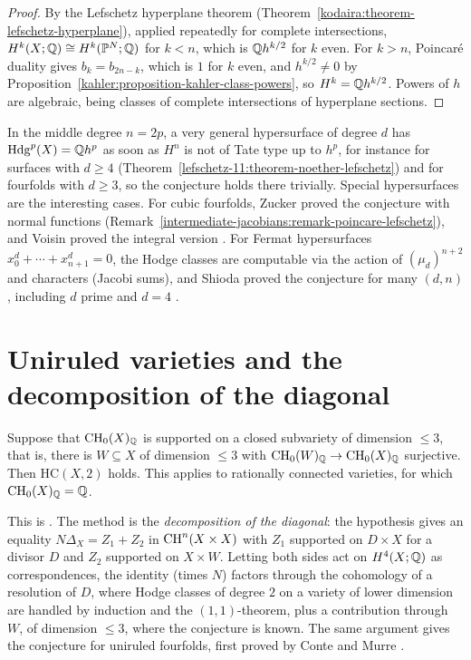 \begin{proof}
By the Lefschetz hyperplane theorem (Theorem~\ref{kodaira:theorem-lefschetz-hyperplane}), applied repeatedly for complete intersections, $H^k(X; \mathbb{Q}) \cong H^k(\mathbb{P}^N; \mathbb{Q})$ for $k < n$, which is
$\mathbb{Q} h^{k/2}$ for $k$ even. For $k > n$, Poincar\'e duality gives $b_k = b_{2n-k}$, which is $1$ for $k$ even, and $h^{k/2} \neq 0$ by Proposition~\ref{kahler:proposition-kahler-class-powers}, so
$H^k = \mathbb{Q} h^{k/2}$. Powers of $h$ are algebraic, being classes of complete intersections of hyperplane sections.
\end{proof}

\begin{remark}\label{known-cases:remark-middle-degree}
In the middle degree $n = 2p$, a very general hypersurface of degree $d$ has $\mathrm{Hdg}^p(X) = \mathbb{Q} h^p$ as soon as $H^{n}$ is not of Tate type up to $h^p$, for instance for surfaces with $d \geq 4$
(Theorem~\ref{lefschetz-11:theorem-noether-lefschetz}) and for fourfolds with $d \geq 3$, so the conjecture holds there trivially. Special hypersurfaces are the interesting cases. For cubic
fourfolds, Zucker proved the conjecture with normal functions (Remark~\ref{intermediate-jacobians:remark-poincare-lefschetz}), and Voisin proved the integral version \cite{voisin-2006}. For
Fermat hypersurfaces $x_0^d + \cdots + x_{n+1}^d = 0$, the Hodge classes are computable via the action of $(\mu_d)^{n+2}$ and characters (Jacobi sums), and Shioda proved the conjecture for many $(d, n)$,
including $d$ prime and $d = 4$ \cite{shioda-1979}.
\end{remark}

\section{Uniruled varieties and the decomposition of the diagonal}\label{known-cases:section-diagonal}

\begin{theorem}\label{known-cases:theorem-bloch-srinivas}
Suppose that $\operatorname{CH}_0(X)_{\mathbb{Q}}$ is supported on a closed subvariety of dimension $\leq 3$, that is, there is $W \subseteq X$ of dimension $\leq 3$ with $\operatorname{CH}_0(W)_{\mathbb{Q}} \to \operatorname{CH}_0(X)_{\mathbb{Q}}$ surjective. Then
$\mathrm{HC}(X, 2)$ holds. This applies to rationally connected varieties, for which $\operatorname{CH}_0(X)_{\mathbb{Q}} = \mathbb{Q}$.
\end{theorem}

This is \cite{bloch-srinivas-1983}. The method is the \emph{decomposition of the diagonal}: the hypothesis gives an equality $N\Delta_X = Z_1 + Z_2$ in $\operatorname{CH}^n(X \times X)$ with $Z_1$ supported on
$D \times X$ for a divisor $D$ and $Z_2$ supported on $X \times W$. Letting both sides act on $H^4(X; \mathbb{Q})$ as correspondences, the identity (times $N$) factors through the cohomology of a resolution of
$D$, where Hodge classes of degree $2$ on a variety of lower dimension are handled by induction and the $(1,1)$-theorem, plus a contribution through $W$, of dimension $\leq 3$, where the conjecture is
known. The same argument gives the conjecture for uniruled fourfolds, first proved by Conte and Murre \cite{conte-murre-1978}.

